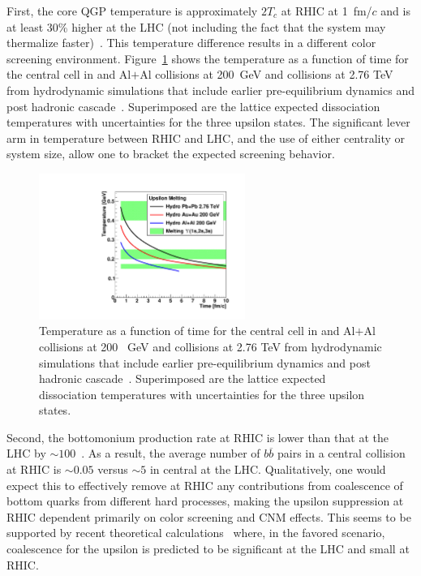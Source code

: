  First, the core QGP temperature is approximately $2 T_c$ at RHIC at
 1~fm/$c$ and is at least 30\% higher at the LHC (not including the
 fact that the system may thermalize faster)~\cite{muller:2012zq}.
 This temperature difference results in a different color screening
 environment.   Figure~\ref{fig:upsilon_time} shows the temperature as a function
of time for the central cell in \auau and Al$+$Al collisions at 200~GeV
and \pbpb collisions at 2.76 TeV from hydrodynamic simulations that include
earlier pre-equilibrium dynamics and post hadronic cascade~\cite{Habich:2014jna}.  
Superimposed are the lattice expected dissociation temperatures with uncertainties
for the three upsilon states.   The significant lever arm in temperature between
RHIC and LHC, and the use of either centrality or system size, allow one to
bracket the expected screening behavior.

\begin{figure}
  \begin{center}
    \includegraphics[width=0.6\textwidth]{figs/figure_upsilon_melting}
  \end{center}
  \caption[Hydrodynamic simulations by Habich et al. of temperature vs
  time in \auau and Al$+$Al collisions at 200~GeV and \pbpb collisions
  at 2.76~TeV]{\label{fig:upsilon_time} Temperature as a function of
    time for the central cell in \auau and Al$+$Al collisions at 200
   ~GeV and \pbpb collisions at 2.76 TeV from hydrodynamic simulations
    that include earlier pre-equilibrium dynamics and post hadronic
    cascade~\cite{Habich:2014jna}.  Superimposed are the lattice
    expected dissociation temperatures with uncertainties for the
    three upsilon states.  }
\end{figure}

Second, the bottomonium production rate at RHIC is lower
 than that at the LHC by $\sim 100$~\cite{Brambilla:2010cs}.  As a
 result, the average number of $b \overline{b}$ pairs in a central \auau
 collision at RHIC is $\sim 0.05$ versus $\sim 5$ in central \pbpb at
 the LHC. Qualitatively, one would expect this to effectively remove
 at RHIC any contributions from coalescence of bottom quarks from
 different hard processes, making the upsilon suppression at RHIC
 dependent primarily on color screening and CNM effects. This seems to
 be supported by recent theoretical calculations~\cite{Emerick:2011xu}
 where, in the favored scenario, coalescence for the upsilon is
 predicted to be significant at the LHC and small at RHIC.

